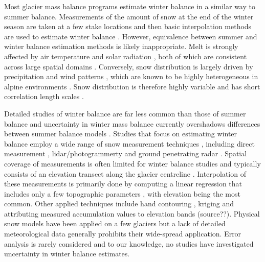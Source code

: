 \documentclass[twocolumn, letterpaper]{igs}
\begin{document}
Most glacier mass balance programs estimate winter balance in a similar way to summer balance. Measurements of the amount of snow at the end of the winter season are taken at a few stake locations and then basic interpolation methods are used to estimate winter balance \citep[e.g.][]{Hock1999, MacDougall2011, Cullen2017}. However, equivalence between summer and winter balance estimation methods is likely inappropriate. Melt is strongly affected by air temperature and solar radiation \citep{Hock2005}, both of which are consistent across large spatial domains \citep{Barry1992}. Conversely, snow distribution is largely driven by precipitation \citep{Lehning2008} and wind patterns \citep{Bernhardt2009, Musselman2015}, which are known to be highly heterogeneous in alpine environments \citep{Barry1992}. Snow distribution is therefore highly variable and has short correlation length scales \citep[e.g.][]{Anderton2004, Egli2011, Grunewald2010, Helbig2017, Lopez2011, Lopez2013, Machguth2006, Marshall2006}. 

Detailed studies of winter balance are far less common than those of summer balance and uncertainty in winter mass balance currently overshadows differences between summer balance models \citep{Reveillet2016}. Studies that focus on estimating winter balance  employ a wide range of snow measurement techniques \citep{Sold2013}, including direct measurement \citep[e.g.][]{Cullen2017}, lidar/photogrammerty \citep[e.g.][]{Sold2013} and ground penetrating radar \citep[e.g.][]{Machguth2006, Gusmeroli2014, McGrath2015}. Spatial coverage of measurements is often limited for winter balance studies and typically consists of an elevation transect along the glacier centreline \citep[e.g.][]{Kaser2003, Machguth2006}. Interpolation of these measurements is primarily done by computing a linear regression that includes only a few topographic parameters \citep[e.g.][]{MacDougall2011}, with elevation being the most common. Other applied techniques include hand contouring \citep[e.g.][]{Tangborn1975}, kriging \citep[e.g.][]{Hock1999} and attributing measured accumulation values to elevation bands (source??). Physical snow models have been applied on a few glaciers \citep{Mott2008, Dadic2010} but a lack of detailed meteorological data generally prohibits their wide-spread application. Error analysis is rarely considered and to our knowledge, no studies have investigated uncertainty in winter balance estimates. 
\end{document}
